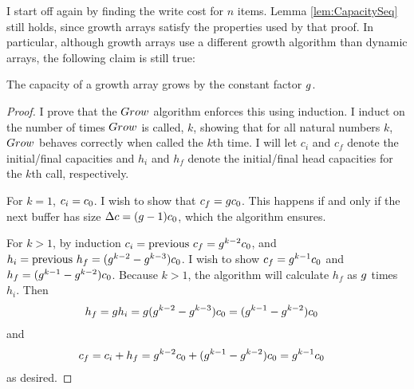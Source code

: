 \HdrGrowthArrayImpl

\HdrTimeComplex

I start off again by finding the write cost for $n$ items. Lemma \ref{lem:CapacitySeq} still holds, since growth arrays satisfy the properties used by that proof. In particular, although growth arrays use a different growth algorithm than dynamic arrays, the following claim is still true:

\begin{lemma}
\label{lem:GrowthArraysGrowthFactor}
	The capacity of a growth array grows by the constant factor $g$.
\end{lemma}

\begin{proof}
	I prove that the $Grow$ algorithm enforces this using induction. I induct on the number of times $Grow$ is called, $k$, showing that for all natural numbers $k$, $Grow$ behaves correctly when called the $k$th time. I will let $c_i$ and $c_f$ denote the initial/final capacities and $h_i$ and $h_f$ denote the initial/final head capacities for the $k$th call, respectively.

	For $k = 1$, $c_i = c_0$. I wish to show that $c_f = gc_0$. This happens if and only if the next buffer has size $\Delta c = (g - 1)c_0$, which the algorithm ensures.
	
	For $k > 1$, by induction $c_i = \text{previous }c_f = g^{k - 2}c_0$, and $h_i = \text{previous }h_f = (g^{k - 2} - g^{k - 3})c_0$. I wish to show $c_f = g^{k - 1}c_0$ and $h_f = (g^{k - 1} - g^{k - 2})c_0$. Because $k > 1$, the algorithm will calculate $h_f$ as $g$ times $h_i$. Then
	\begin{align*}
	h_f &= g h_i = g (g^{k - 2} - g^{k - 3})c_0 = (g^{k - 1} - g^{k - 2})c_0
	\end{align*}
	and
	\begin{align*}
	c_f &= c_i + h_f = g^{k - 2}c_0 + (g^{k - 1} - g^{k - 2})c_0 = g^{k - 1}c_0
	\end{align*}
	as desired.
\end{proof}

